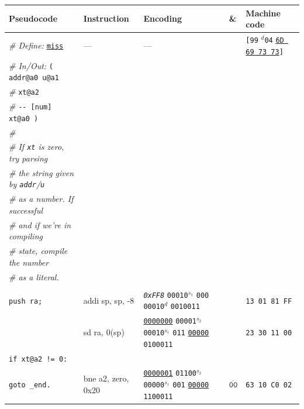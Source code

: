 \documentclass[a4paper,12pt,final]{article}
\begin{document}
\begin{table}[!htbp] \begin{adjustwidth}{-1cm}{-1cm} \fontsize{8}{9.600000}\selectfont
\begin{center}
\begin{tabular}{l|ll|l|l}
\textbf{Pseudocode} & \textbf{Instruction} & \textbf{Encoding} & \textbf{\&} & \textbf{Machine code}\\[0pt]
\hline
\emph{\# Define:} \uline{\texttt{miss}} & --- & --- &  & \texttt{[99} \(^{d}\)​\texttt{04} \uline{\texttt{6D 69 73 73}}​\texttt{]}\\[0pt]
\emph{\# In/Out:}     \texttt{( addr@a0 u@a1} &  &  &  & \\[0pt]
\emph{\#}\hspace{4.9em}       \texttt{xt@a2} &  &  &  & \\[0pt]
\emph{\#}\hspace{3.35em} \texttt{-​- [num] xt@a0 )} &  &  &  & \\[0pt]
\emph{\#} &  &  &  & \\[0pt]
\emph{\# If \texttt{xt} is zero, try parsing} &  &  &  & \\[0pt]
\emph{\# the string given by \texttt{addr}​/​\texttt{u}} &  &  &  & \\[0pt]
\emph{\# as a number. If successful} &  &  &  & \\[0pt]
\emph{\# and if we're in compiling} &  &  &  & \\[0pt]
\emph{\# state, compile the number} &  &  &  & \\[0pt]
\emph{\# as a literal.} &  &  &  & \\[0pt]
 &  &  &  & \\[0pt]
\hspace{1.053000em} \texttt{push ra;} & addi sp, sp, -8 & \emph{\texttt{0xFF8}}                    \texttt{00010}​\(^{s_{1}}\) \texttt{000} \texttt{00010}​\(^{d}\)  \texttt{0010011} &  & \texttt{13 01 81 FF}\\[0pt]
\hspace{1.053000em} & sd ra, 0(sp) & \uline{\texttt{0000000}} \texttt{00001}​\(^{s_{2}}\) \texttt{00010}​\(^{s_{1}}\) \texttt{011} \uline{\texttt{00000}} \texttt{0100011} &  & \texttt{23 30 11 00}\\[0pt]
\hspace{1.053000em} \texttt{if xt@a2 != 0:} &  &  &  & \\[0pt]
\hspace{2.106000em}   \texttt{goto \_end.} & bne a2, zero, 0x20 & \uline{\texttt{0000001}} \texttt{01100}​\(^{s_{2}}\) \texttt{00000}​\(^{s_{1}}\) \texttt{001} \uline{\texttt{00000}} \texttt{1100011} & \(\overline{\texttt{00}}\) & \texttt{63 10 C0 02}\\[0pt]

\end{tabular}
\end{center}
\end{adjustwidth}
\end{table}
\end{document}
